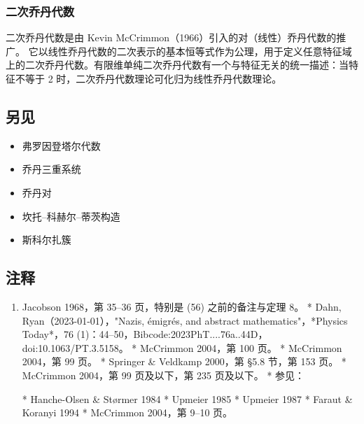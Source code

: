 \subsubsection{二次乔丹代数}
二次乔丹代数是由 Kevin McCrimmon（1966）引入的对（线性）乔丹代数的推广。
它以线性乔丹代数的二次表示的基本恒等式作为公理，用于定义任意特征域上的二次乔丹代数。有限维单纯二次乔丹代数有一个与特征无关的统一描述：当特征不等于 2 时，二次乔丹代数理论可化归为线性乔丹代数理论。
\subsection{另见}
\begin{itemize}
\item 弗罗因登塔尔代数
\item 乔丹三重系统
\item 乔丹对
\item 坎托–科赫尔–蒂茨构造
\item 斯科尔扎簇
\end{itemize}
\subsection{注释}
\begin{enumerate}
\item Jacobson 1968，第 35–36 页，特别是 (56) 之前的备注与定理 8。
* Dahn, Ryan（2023-01-01），"Nazis, émigrés, and abstract mathematics"，*Physics Today*，76 (1)：44–50，Bibcode:2023PhT....76a..44D，doi:10.1063/PT.3.5158。
* McCrimmon 2004，第 100 页。
* McCrimmon 2004，第 99 页。
* Springer & Veldkamp 2000，第 §5.8 节，第 153 页。
* McCrimmon 2004，第 99 页及以下，第 235 页及以下。
* 参见：

  * Hanche-Olsen & Størmer 1984
  * Upmeier 1985
  * Upmeier 1987
  * Faraut & Koranyi 1994
* McCrimmon 2004，第 9–10 页。
\end{enumerate}
